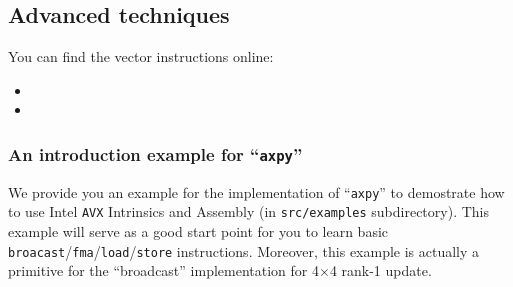 \subsection{Advanced techniques}
You can find the vector instructions online:
\begin{itemize}
\item {}
\item {}
\end{itemize}

\subsubsection{An introduction example for ``{\tt axpy}''}
We provide you an example for the implementation of ``{\tt axpy}'' to demostrate how to use Intel {\tt AVX} Intrinsics and Assembly (in {\tt src/examples} subdirectory). This example will serve as a good start point for you to learn basic {\tt broacast}/{\tt fma}/{\tt load}/{\tt store} instructions. Moreover, this example is actually a primitive for the ``broadcast'' implementation for 4$\times$4 rank-1 update.

